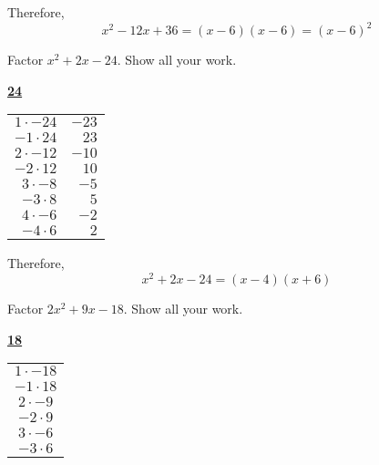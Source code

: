 \documentclass[11pt,letterpaper]{article}
\begin{document}
Therefore,
	\[
	x^2 - 12x + 36= (x - 6)(x - 6)= (x - 6)^2
	\]





\newpage





 Factor $x^2 + 2x - 24$. Show all your work. \pspace

\sol 
	\begin{table}[!ht]
	\centering
	\underline{\bfseries 24} \pvspace{0.2cm}
	\begin{tabular}{rr}
	$1 \cdot -24$ & $-23$ \\
	$-1 \cdot 24$ & $23$ \\
	$2 \cdot -12$ & $-10$ \\
	$-2 \cdot 12$ & $10$ \\
	$3 \cdot -8 $ & $-5$ \\
	$-3 \cdot 8$ & $5$ \\
	$4 \cdot -6$ & $-2$ \\ \hline
	\multicolumn{1}{|r}{$-4 \cdot 6$} & \multicolumn{1}{r|}{$2$} \\ \hline
	\end{tabular}
	\end{table}

Therefore,
	\[
	x^2 + 2x - 24= (x - 4)(x + 6)
	\]





\newpage





 Factor $2x^2 + 9x - 18$. Show all your work. \pspace

\sol 
	\begin{table}[!ht]
	\centering
	\underline{\bfseries 18} \pvspace{0.1cm}
	\begin{tabular}{c}
	$1 \cdot -18$ \\
	$-1 \cdot 18$ \\
	$2 \cdot -9$ \\
	$-2 \cdot 9$ \\
	$3 \cdot -6$ \\
	$-3 \cdot 6$
	\end{tabular}
	\end{table}
\end{document}

